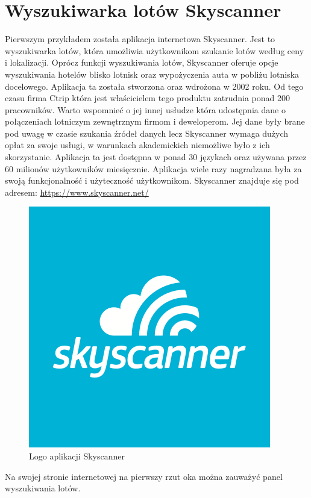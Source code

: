 \documentclass[12pt, twoside]{report}
\begin{document}
\section{Wyszukiwarka lotów Skyscanner}
Pierwszym przykładem została aplikacja internetowa Skyscanner. Jest to wyszukiwarka lotów, która umożliwia użytkownikom szukanie lotów według ceny i lokalizacji. Oprócz funkcji wyszukiwania lotów, Skyscanner oferuje opcje wyszukiwania hotelów blisko lotnisk oraz wypożyczenia auta w pobliżu lotniska docelowego. Aplikacja ta została stworzona oraz wdrożona w 2002 roku. Od tego czasu firma Ctrip która jest właścicielem tego produktu zatrudnia ponad 200 pracowników. Warto wspomnieć o jej innej usłudze która udostępnia dane o połączeniach lotniczym zewnętrznym firmom i deweloperom. Jej dane były brane pod uwagę w czasie szukania źródeł danych lecz Skyscanner wymaga dużych opłat za swoje usługi, w warunkach akademickich niemożliwe było z ich skorzystanie.
 Aplikacja ta jest dostępna w ponad 30 językach oraz używana przez 60 milionów użytkowników miesięcznie. Aplikacja wiele razy nagradzana była za swoją funkcjonalność i użyteczność użytkownikom. Skyscanner znajduje się pod adresem: \url{https://www.skyscanner.net/}

\vspace{1.0cm}
\begin{figure}[!ht]
\centering
\includegraphics[scale=0.4, keepaspectratio]{skyscanner.png}
\caption{Logo aplikacji Skyscanner}
\label{fig:skyscanner}
\end{figure}

 
\newpage
Na swojej stronie internetowej na pierwszy rzut oka można zauważyć panel wyszukiwania lotów.
\end{document}
